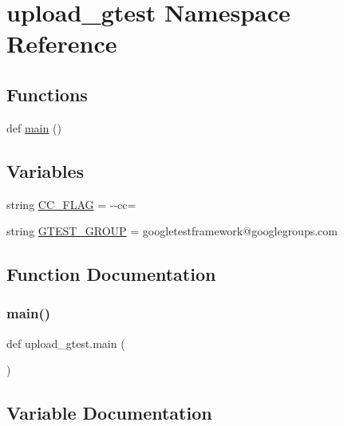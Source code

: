 \hypertarget{namespaceupload__gtest}{}\section{upload\+\_\+gtest Namespace Reference}
\label{namespaceupload__gtest}
\subsection*{Functions}
\begin{DoxyCompactItemize}
\item 
def \mbox{\hyperlink{namespaceupload__gtest_ab5bef7b968c54c632a52c1b4a3d37bdd}{main}} ()
\end{DoxyCompactItemize}
\subsection*{Variables}
\begin{DoxyCompactItemize}
\item 
string \mbox{\hyperlink{namespaceupload__gtest_a83f0946f9ee3731253fc622acd581fc2}{C\+C\+\_\+\+F\+L\+AG}} = \textquotesingle{}-\/-\/cc=\textquotesingle{}
\item 
string \mbox{\hyperlink{namespaceupload__gtest_af282f4c60bf6069ed0abf4e06d9b70ab}{G\+T\+E\+S\+T\+\_\+\+G\+R\+O\+UP}} = \textquotesingle{}googletestframework@googlegroups.\+com\textquotesingle{}
\end{DoxyCompactItemize}


\subsection{Function Documentation}
\mbox{\label{namespaceupload__gtest_ab5bef7b968c54c632a52c1b4a3d37bdd}} 
\subsubsection{\texorpdfstring{main()}{main()}}
{\footnotesize\ttfamily def upload\+\_\+gtest.\+main (\begin{DoxyParamCaption}{ }\end{DoxyParamCaption})}



\subsection{Variable Documentation}
\mbox{\label{namespaceupload__gtest_a83f0946f9ee3731253fc622acd581fc2}} 
